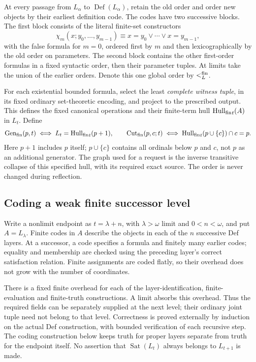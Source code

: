 At every passage from $L_\alpha$ to $\operatorname{Def}(L_\alpha)$,
retain the old order and order new objects by their earliest definition
code. The codes have two successive blocks. The first block consists
of the literal finite-set constructors
\[
 \chi_m(x;y_0,\ldots,y_{m-1})\equiv
 x=y_0\lor\cdots\lor x=y_{m-1},
\]
with the false formula for $m=0$, ordered first by $m$ and then
lexicographically by the old order on parameters. The second block
contains the other first-order formulas in a fixed syntactic order,
then their parameter tuples. At limits take the union of the earlier
orders. Denote this one global order by $<_L^{\rm fin}$.

For each existential bounded formula, select the least \emph{complete
witness tuple}, in its fixed ordinary set-theoretic encoding, and
project to the prescribed output. This defines the fixed canonical
operations and their finite-term hull $\operatorname{Hull_{fin}}_t(A)$ in $L_t$. Define
\[
 \operatorname{Gen_{fin}}(p,t)\iff L_t=\operatorname{Hull_{fin}}_t(p+1),\qquad
 \operatorname{Cut_{fin}}(p,c;t)\iff\operatorname{Hull_{fin}}_t(p\cup\{c\})\cap c=p.
\]
Here $p+1$ includes $p$ itself; $p\cup\{c\}$ contains all ordinals
below $p$ and $c$, not $p$ as an additional generator. The graph used
for a request is the inverse transitive collapse of this specified
hull, with its required exact source. The order is never changed
during reflection. 

\subsection{Coding a weak finite successor level}
Write a nonlimit endpoint as $t=\lambda+n$, with $\lambda>\omega$
limit and $0<n<\omega$, and put $A=L_\lambda$. Finite codes in $A$
describe the objects in each of the $n$ successive Def layers. At a
successor, a code specifies a formula and finitely many earlier codes;
equality and membership are checked using the preceding layer's
correct satisfaction relation. Finite assignments are coded flatly,
so their overhead does not grow with the number of coordinates.

There is a fixed finite overhead for each of the layer-identification,
finite-evaluation and finite-truth constructions. A limit absorbs this
overhead. Thus the required fields can be separately supplied at the
next level; their ordinary joint tuple need not belong to that level.
Correctness is proved externally by induction on the actual Def
construction, with bounded verification of each recursive step.
The coding construction below keeps truth for proper layers separate
from truth for the endpoint itself. No assertion that $\operatorname{Sat}(L_t)$ always
belongs to $L_{t+1}$ is made.

